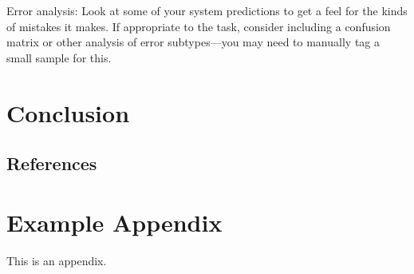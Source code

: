\documentclass[11pt]{article}
\begin{document}
Error analysis: Look at some of your system predictions to get a feel for the kinds of mistakes it makes. If appropriate to the task, consider including a confusion matrix or other analysis of error subtypes—you may need to manually tag a small sample for this.
\cite{Aho:72}

\section{Conclusion}

\subsection{References}



\appendix

\section{Example Appendix}
\label{sec:appendix}

This is an appendix.
\end{document}
